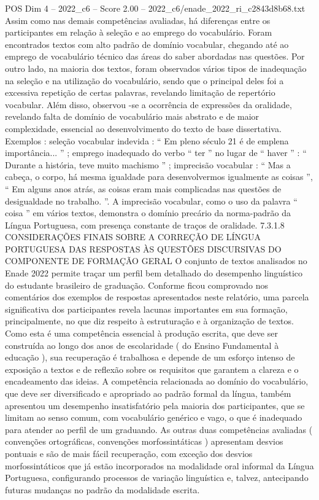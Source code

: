 \begin{textsample}{POS Dim 4 – 2022\_c6 – Score 2.00 – 2022\_c6/enade\_2022\_ri\_c2843d8b68.txt}
Assim como nas demais competências avaliadas, há diferenças entre os participantes em relação à seleção e ao emprego do vocabulário.
Foram encontrados textos com alto padrão de domínio vocabular, chegando até ao emprego de vocabulário técnico das áreas do saber abordadas nas questões.
Por outro lado, na maioria dos textos, foram observados vários tipos de inadequação na seleção e na utilização do vocabulário, sendo que o principal deles foi a excessiva repetição de certas palavras, revelando limitação de repertório vocabular.
Além disso, observou -se a ocorrência de expressões da oralidade, revelando falta de domínio de vocabulário mais abstrato e de maior complexidade, essencial ao desenvolvimento do texto de base dissertativa.
Exemplos : seleção vocabular indevida : “ Em pleno século 21 é de emplena importância... ” ; emprego inadequado do verbo “ ter ” no lugar de “ haver ” : “ Durante a história, teve muito machismo ” ; imprecisão vocabular : “ Mas a cabeça, o corpo, há mesma igualdade para desenvolvermos igualmente as coisas ”, “ Em alguns anos atrás, as coisas eram mais complicadas nas questões de desigualdade no trabalho. ”.
A imprecisão vocabular, como o uso da palavra “ coisa ” em vários textos, demonstra o domínio precário da norma-padrão da Língua Portuguesa, com presença constante de traços de oralidade. 7.3.1.8 CONSIDERAÇÕES FINAIS SOBRE A CORREÇÃO DE LÍNGUA PORTUGUESA DAS RESPOSTAS ÀS QUESTÕES DISCURSIVAS DO COMPONENTE DE FORMAÇÃO GERAL O conjunto de textos analisados no Enade 2022 permite traçar um perfil bem detalhado do desempenho linguístico do estudante brasileiro de graduação.
Conforme ficou comprovado nos comentários dos exemplos de respostas apresentados neste relatório, uma parcela significativa dos participantes revela lacunas importantes em sua formação, principalmente, no que diz respeito à estruturação e à organização de textos.
Como esta é uma competência essencial à produção escrita, que deve ser construída ao longo dos anos de escolaridade ( do Ensino Fundamental à educação ), sua recuperação é trabalhosa e depende de um esforço intenso de exposição a textos e de reflexão sobre os requisitos que garantem a clareza e o encadeamento das ideias.
A competência relacionada ao domínio do vocabulário, que deve ser diversificado e apropriado ao padrão formal da língua, também apresentou um desempenho insatisfatório pela maioria dos participantes, que se limitam ao senso comum, com vocabulário genérico e vago, o que é inadequado para atender ao perfil de um graduando.
As outras duas competências avaliadas ( convenções ortográficas, convenções morfossintáticas ) apresentam desvios pontuais e são de mais fácil recuperação, com exceção dos desvios morfossintáticos que já estão incorporados na modalidade oral informal da Língua Portuguesa, configurando processos de variação linguística e, talvez, antecipando futuras mudanças no padrão da modalidade escrita.

\end{textsample}
